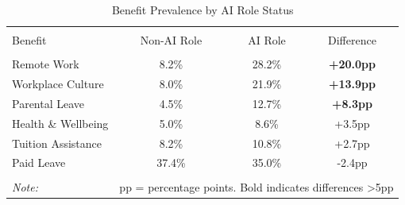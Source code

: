 \begin{table}[!htbp] \centering
\caption{Benefit Prevalence by AI Role Status}
\label{tab:ai_benefits_clean}
\begin{tabular}{lccc}
\\[-1.8ex]\hline
\hline \\[-1.8ex]
Benefit & Non-AI Role & AI Role & Difference \\
\hline \\[-1.8ex]
Remote Work & 8.2\% & 28.2\% & \textbf{+20.0pp} \\
Workplace Culture & 8.0\% & 21.9\% & \textbf{+13.9pp} \\
Parental Leave & 4.5\% & 12.7\% & \textbf{+8.3pp} \\
Health \& Wellbeing & 5.0\% & 8.6\% & +3.5pp \\
Tuition Assistance & 8.2\% & 10.8\% & +2.7pp \\
Paid Leave & 37.4\% & 35.0\% & -2.4pp \\
\hline
\hline \\[-1.8ex]
\textit{Note:} & \multicolumn{3}{r}{pp = percentage points. Bold indicates differences >5pp} \\
\end{tabular}\end{table}
